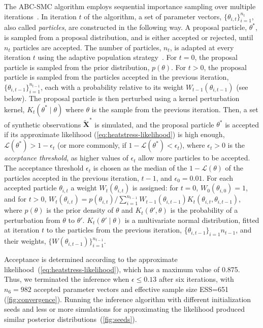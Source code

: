 \documentclass[12pt]{extarticle}
\let\vec\mathbf
\newcommand{\likelihood}{\mathcal{L}}
\begin{document}
The ABC-SMC algorithm employs sequential importance sampling over multiple iterations~\citep{Toni2009, Klinger2017, Syga2021}.
In iteration $t$ of the algorithm, a set of parameter vectors, $\{\theta_{i,t}\}_{i=1}^{n_t}$, also called \emph{particles}, are constructed in the following way.
A proposal particle, $\theta^*$, is sampled from a proposal distribution, and is either accepted or rejected, until $n_t$ particles are accepted.
The number of particles, $n_t$, is adapted at every iteration $t$ using the adaptive population strategy~\citep[\href{https://pyabc.readthedocs.io}{pyabc.readthedocs.io}]{Klinger2018}.
For $t=0$, the proposal particle is sampled from the prior distribution, $p(\theta)$.
For $t>0$, the proposal particle is sampled from the particles accepted in the previous iteration, $\{\theta_{i,t-1}\}_{i=1}^{n_{t-1}}$, each with a probability relative to its weight $W_{t-1}(\theta_{i,t-1})$ (see below). The proposal particle is then perturbed using a kernel perturbation kernel, $K_t(\theta^* \mid \theta)$ where $\theta$ is the sample from the previous iteration.
Then, a set of synthetic observations $\tilde{\vec X}^*$ is simulated, and the proposal particle $\theta^*$ is accepted if its approximate likelihood (\autoref{eq:heatstress-likelihood}) is high enough, $\likelihood(\theta^*)>1-\epsilon_t$ (or more commonly, if $1-\likelihood(\theta^*) < \epsilon_t$), where $\epsilon_t>0$ is the \emph{acceptance threshold}, as higher values of $\epsilon_t$ allow more particles to be accepted. 
The acceptance threshold $\epsilon_t$ is chosen as the median of the $1-\likelihood(\theta)$ of the particles accepted in the previous iteration, $t-1$, and $\epsilon_0=0.01$. 
For each accepted particle $\theta_{i,t}$ a weight $W_t(\theta_{i,t})$ is assigned: for $t=0$, $W_0(\theta_{i,0})=1$, and for $t>0$, 
$W_t(\theta_{i,t}) = p(\theta_{i,t}) / \sum_{i=1}^{n_{t-1}}{W_{t-1}(\theta_{i,t-1}) K_t(\theta_{i,t}, \theta_{i,t-1})}$, where $p(\theta)$ is the prior density of $\theta$ and $K_t(\theta', \theta)$ is the probability of a perturbation from $\theta$ to $\theta'$.
$K_t(\theta' \mid \theta)$ is a multivariate normal distribution, fitted at iteration $t$ to the particles from the previous iteration, \{$\theta_{i,t-1}\}_{i=1}{n_{t-1}}$, and their weights, $\{W(\theta_{i,t-1})\}_{i=1}^{n_{t-1}}$.

Acceptance is determined according to the approximate likelihood~(\autoref{eq:heatstress-likelihood}), which has a maximum value of 0.875. Thus, we terminated the inference when $\epsilon \le 0.13$ after six iterations, with $n_6=982$ accepted parameter vectors and effective sample size ESS=651 (\autoref{fig:convergence}). %
Running the inference algorithm with different initialization seeds and less or more simulations for approximating the likelihood produced similar posterior distributions~(\autoref{fig:seeds}). %
\end{document}
